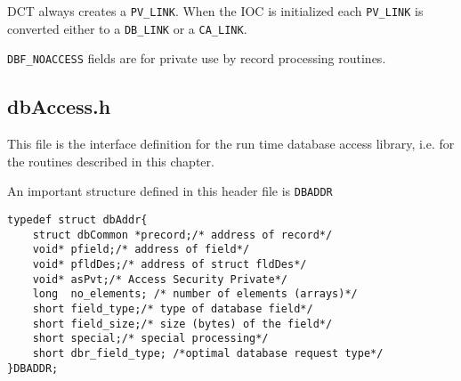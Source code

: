 DCT always creates a \verb|PV_LINK|. When the IOC is initialized each \verb|PV_LINK| is converted either to a \verb|DB_LINK| or a 
\verb|CA_LINK|.

\verb|DBF_NOACCESS| fields are for private use by record processing routines.

\subsection{dbAccess.h}

This file is the interface definition for the run time database access library, i.e. for the routines described in this chapter.

An important structure defined in this header file is \verb|DBADDR| 

\begin{verbatim}typedef struct dbAddr{
    struct dbCommon *precord;/* address of record*/
    void* pfield;/* address of field*/
    void* pfldDes;/* address of struct fldDes*/
    void* asPvt;/* Access Security Private*/
    long  no_elements; /* number of elements (arrays)*/
    short field_type;/* type of database field*/
    short field_size;/* size (bytes) of the field*/
    short special;/* special processing*/
    short dbr_field_type; /*optimal database request type*/
}DBADDR;
\end{verbatim}
